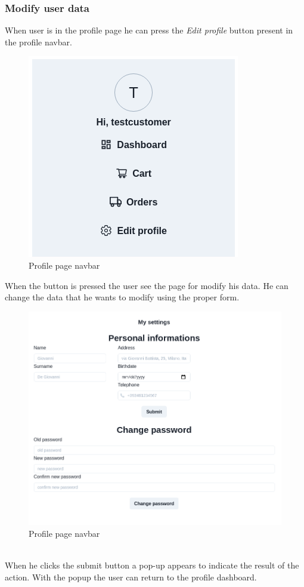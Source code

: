 \subsubsection{Modify user data}
When user is in the profile page he can press the \textit{Edit profile} button present in the profile navbar.
\begin{figure}[!ht]
    \caption{Profile page navbar}
    \vspace{10px}
    \includegraphics[scale=0.5]{../../../../Images/userManual/dashboardNavBar.png}
    \centering
\end{figure}
When the button is pressed the user see the page for modify his data. He can change the data that he wants to modify using the proper form.
\begin{figure}[!ht]
    \caption{Profile page navbar}
    \vspace{10px}
    \includegraphics[scale=0.3]{../../../../Images/userManual/profileModfication.png}
    \centering
\end{figure}
\\
When he clicks the submit button a pop-up appears to indicate the result of the action. With the popup the user can return to the profile dashboard.
\newpage
